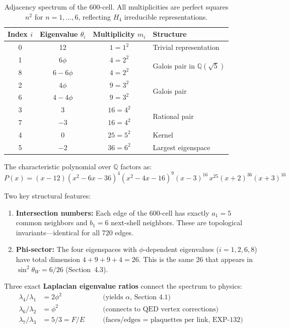 \documentclass[12pt,a4paper]{article}
\begin{document}
\begin{table}[H]
\centering
\begin{tabular}{cccl}
\toprule
\textbf{Index} $i$ & \textbf{Eigenvalue} $\theta_i$ & \textbf{Multiplicity} $m_i$ & \textbf{Structure} \\
\midrule
0 & 12             & $1 = 1^2$   & Trivial representation \\
1 & $6\phi$        & $4 = 2^2$   & \multirow{2}{*}{Galois pair in $\mathbb{Q}(\sqrt{5})$} \\
8 & $6 - 6\phi$    & $4 = 2^2$   & \\
2 & $4\phi$        & $9 = 3^2$   & \multirow{2}{*}{Galois pair} \\
6 & $4 - 4\phi$    & $9 = 3^2$   & \\
3 & 3              & $16 = 4^2$  & \multirow{2}{*}{Rational pair} \\
7 & $-3$           & $16 = 4^2$  & \\
4 & 0              & $25 = 5^2$  & Kernel \\
5 & $-2$           & $36 = 6^2$  & Largest eigenspace \\
\bottomrule
\end{tabular}
\caption{Adjacency spectrum of the 600-cell. All multiplicities are perfect squares $n^2$ for $n = 1, \ldots, 6$, reflecting $H_4$ irreducible representations.}
\label{tab:spectrum}
\end{table}

The characteristic polynomial over $\mathbb{Q}$ factors as:
\begin{equation}
P(x) = (x-12)(x^2-6x-36)^4(x^2-4x-16)^9(x-3)^{16}\,x^{25}(x+2)^{36}(x+3)^{16}
\end{equation}

Two key structural features:
\begin{enumerate}
    \item \textbf{Intersection numbers:} Each edge of the 600-cell has exactly $a_1 = 5$ common neighbors and $b_1 = 6$ next-shell neighbors. These are topological invariants---identical for all 720 edges.
    \item \textbf{Phi-sector:} The four eigenspaces with $\phi$-dependent eigenvalues ($i = 1, 2, 6, 8$) have total dimension $4 + 9 + 9 + 4 = 26$. This is the same 26 that appears in $\sin^2\theta_W = 6/26$ (Section~4.3).
\end{enumerate}

Three exact \textbf{Laplacian eigenvalue ratios} connect the spectrum to physics:
\begin{align}
\lambda_4 / \lambda_1 &= 2\phi^2 &\quad &\text{(yields } \alpha \text{, Section~4.1)} \\
\lambda_6 / \lambda_2 &= \phi^2 &\quad &\text{(connects to QED vertex corrections)} \\
\lambda_7 / \lambda_3 &= 5/3 = F/E &\quad &\text{(faces/edges = plaquettes per link, EXP-132)}
\end{align}
\end{document}
